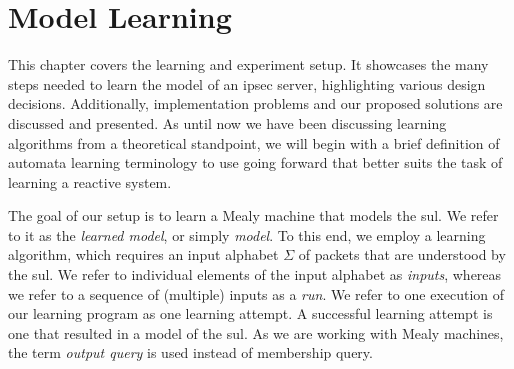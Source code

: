 %
%
% 
% 
% 

\chapter{Model Learning}

\label{chap:Learning}

This chapter covers the learning and experiment setup. It showcases the many steps needed to learn the model of an \ac{ipsec} server, highlighting various design decisions. Additionally, implementation problems and our proposed solutions are discussed and presented. As until now we have been discussing learning algorithms from a theoretical standpoint, we will begin with a brief definition of automata learning terminology to use going forward that better suits the task of learning a reactive system. 

The goal of our setup is to learn a Mealy machine that models the \ac{sul}. We refer to it as the \textit{learned model}, or simply \textit{model}. To this end, we employ a learning algorithm, which requires an input alphabet $\Sigma$ of packets that are understood by the \ac{sul}. We refer to individual elements of the input alphabet as \textit{inputs}, whereas we refer to a sequence of (multiple) inputs as a \textit{run}. We refer to one execution of our learning program as one learning attempt. A successful learning attempt is one that resulted in a model of the \ac{sul}. As we are working with Mealy machines, the term \textit{output query} is used instead of membership query.

\iffalse
